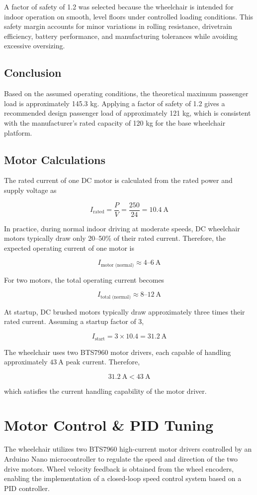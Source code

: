 A factor of safety of 1.2 was selected because the wheelchair is intended for indoor operation on smooth, level floors under controlled loading conditions. This safety margin accounts for minor variations in rolling resistance, drivetrain efficiency, battery performance, and manufacturing tolerances while avoiding excessive oversizing.
\subsection*{Conclusion}
Based on the assumed operating conditions, the theoretical maximum passenger load is
approximately 145.3 kg. Applying a factor of safety of 1.2 gives a recommended design
passenger load of approximately 121 kg, which is consistent with the manufacturer's rated
capacity of 120 kg for the base wheelchair platform.

\subsection*{Motor Calculations}

The rated current of one DC motor is calculated from the rated power and supply voltage as

\[
I_{\text{rated}}=\frac{P}{V}
=\frac{250}{24}
=10.4~\mathrm{A}
\]

In practice, during normal indoor driving at moderate speeds, DC wheelchair motors typically draw only 20--50\% of their rated current. Therefore, the expected operating current of one motor is

\[
I_{\text{motor (normal)}} \approx 4\text{--}6~\mathrm{A}
\]

For two motors, the total operating current becomes

\[
I_{\text{total (normal)}} \approx 8\text{--}12~\mathrm{A}
\]

At startup, DC brushed motors typically draw approximately three times their rated current. Assuming a startup factor of 3,

\[
I_{\text{start}}
=3\times10.4
=31.2~\mathrm{A}
\]

The wheelchair uses two BTS7960 motor drivers, each capable of handling approximately \(43~\mathrm{A}\) peak current. Therefore,

\[
31.2~\mathrm{A}<43~\mathrm{A}
\]

which satisfies the current handling capability of the motor driver.    
\section{Motor Control \& PID Tuning}
The wheelchair utilizes two BTS7960 high-current motor drivers controlled by an Arduino Nano microcontroller to regulate the speed and direction of the two drive motors. Wheel velocity feedback is obtained from the wheel encoders, enabling the implementation of a closed-loop speed control system based on a PID controller.
